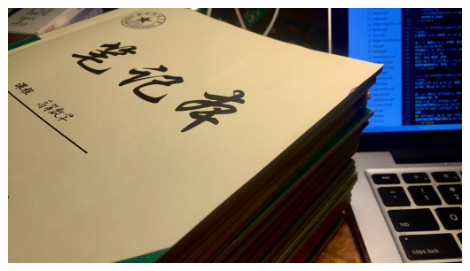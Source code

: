 \begin{frame}
	\centering
	\includegraphics[width=0.9\textwidth]{./images/ch01/HWR/notebook.jpg}
\end{frame}